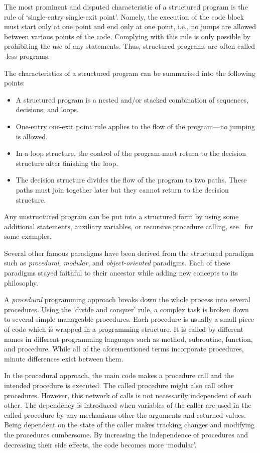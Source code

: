 	The most prominent and disputed characteristic of a structured program is the rule of `single-entry single-exit point'. Namely, the execution of the code block must start only at one point and end only at one point, i.e., no jumps are allowed between various points of the code. Complying with this rule is only possible by prohibiting the use of any  statements. Thus, structured programs are often called -less programs.

	The characteristics of a structured program can be summarised into the following points:
	\begin{itemize}
	\item A structured program is a nested and/or stacked combination of sequences, decisions, and loops.
	\item One-entry one-exit point rule applies to the flow of the program---no jumping is allowed.
	\item In a loop structure, the control of the program must return to the decision structure after finishing the loop.
	\item The decision structure divides the flow of the program to two paths. These paths must join together later but they cannot return to the decision structure.
	\end{itemize}
	Any unstructured program can be put into a structured form by using some additional statements, auxiliary variables, or recursive procedure calling, see~\autocite{Farrell.2015} for some examples.
	
	Several other famous paradigms have been derived from the structured paradigm such as \textit{procedural}, \textit{modular}, and \textit{object-oriented} paradigms. Each of these paradigms stayed faithful to their ancestor while adding new concepts to its philosophy.
	
	A \textit{procedural} programming approach breaks down the whole process into several procedures. Using the `divide and conquer' rule, a complex task is broken down to several simple manageable procedures. Each procedure is usually a small piece of code which is wrapped in a programming structure. It is called by different names in different programming languages such as method, subroutine, function, and procedure. While all of the aforementioned terms incorporate procedures, minute differences exist between them. 
	
	In the procedural approach, the main code makes a procedure call and the intended procedure is executed. The called procedure might also call other procedures. However, this network of calls is not necessarily independent of each other. The dependency is introduced when variables of the caller are used in the called procedure by any mechanisms other the arguments and returned values. Being dependent on the state of the caller makes tracking changes and modifying the procedures cumbersome. By increasing the independence of procedures and decreasing their side effects, the code becomes more `modular'.
	
